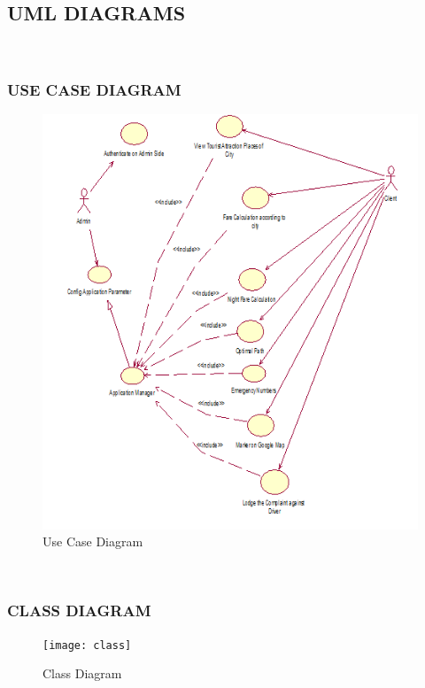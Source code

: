 \documentclass[12pt,a4paper]{article}
\begin{document}
\subsection{UML DIAGRAMS}
\\
\subsubsection{USE CASE DIAGRAM}
\begin{figure}[!htb]
\centering
\includegraphics[width=15 cm]{UseCase}
\caption{Use Case Diagram}
\end{figure}
\\
\newpage
\subsubsection{CLASS DIAGRAM}
\begin{figure}[!htb]
\centering
\texttt{[image: class]}
\caption{Class Diagram}
\end{figure}
\\
\newpage
\end{document}
